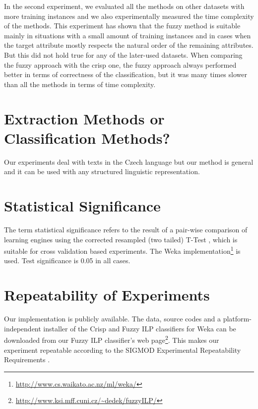 In the second experiment, we evaluated all the methods on other datasets with more training instances and we also experimentally measured the time complexity of the methods. This experiment has shown that the fuzzy method is suitable mainly in situations with a small amount of training instances and in cases when the target attribute mostly respects the natural order of the remaining attributes. But this did not hold true for any of the later-used datasets. When comparing the fuzzy approach with the crisp one, the fuzzy approach always performed better in terms of correctness of the classification, but it was many times slower than all the methods in terms of time complexity.






\section{Extraction Methods or Classification Methods?}


Our experiments deal with texts in the Czech language but our method is general and it can be used with any structured linguistic representation. 

\section{Statistical Significance}
The term statistical significance refers to the result of a pair-wise comparison of learning engines using the corrected resampled (two tailed) T-Test \citep{Nadeau:2003:IGE:779909.779927}, which is suitable for cross validation based experiments. The Weka implementation\footnote{\url{http://www.cs.waikato.ac.nz/ml/weka/}} is used. Test significance is 0.05 in all cases.


\section{Repeatability of Experiments} \label{sec:conclusion_repeatablity}


Our implementation is publicly available. The data, source codes and a platform-independent installer of the Crisp and Fuzzy ILP classifiers for Weka can be downloaded from our Fuzzy ILP classifier's web page\footnote{\url{http://www.ksi.mff.cuni.cz/~dedek/fuzzyILP/}}. This makes our experiment repeatable according to the
SIGMOD Experimental Repeatability Requirements \citep{biblio:SIGMODrepeatability}.



